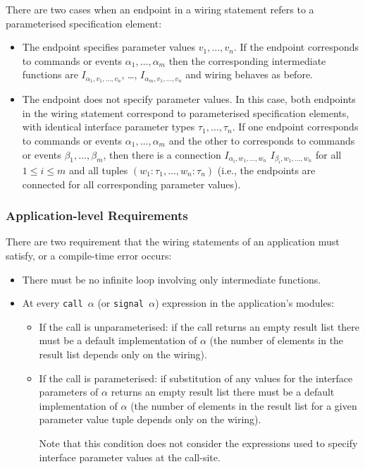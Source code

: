 \documentclass[11pt,letterpaper]{article}
\newcommand{\code}[1]{{\tt #1}}
\begin{document}
There are two cases when an endpoint in a wiring statement refers to a
parameterised specification element:
\begin{itemize}
\item The endpoint specifies parameter values $v_1, \ldots, v_n$. If the
endpoint corresponds to commands or events $\alpha_1, \ldots, \alpha_m$
then the corresponding intermediate functions are
$I_{\alpha_1,v_1,\ldots,v_n}$, \ldots, $I_{\alpha_m,v_1,\ldots,v_n}$ and
wiring behaves as before.
\item The endpoint does not specify parameter values. In this case, both
endpoints in the wiring statement correspond to parameterised specification
elements, with identical interface parameter types $\tau_1, \ldots,
\tau_n$. If one endpoint corresponds to commands or events $\alpha_1,
\ldots, \alpha_m$ and the other to corresponds to commands or events
$\beta_1, \ldots, \beta_m$, then there is a connection $I_{\alpha_i, w_1,
\ldots, w_n}$ \code{<->} $I_{\beta_i, w_1,\ldots, w_n}$ for all $1 \leq i
\leq m$ and all tuples $(w_1:\tau_1, \ldots, w_n:\tau_n)$ (i.e., the
endpoints are connected for all corresponding parameter values).
\end{itemize}

\subsubsection{Application-level Requirements}
\label{sec:wiring-reqs}

There are two requirement that the wiring statements of an application must
satisfy, or a compile-time error occurs:
\begin{itemize}
\item There must be no infinite loop involving only intermediate functions.
\item At every \code{call $\alpha$} (or \code{signal $\alpha$}) expression
in the application's modules:
\begin{itemize}
\item If the call is unparameterised: if the call returns an empty result
list there must be a default implementation of $\alpha$ (the number of
elements in the result list depends only on the wiring).
\item If the call is parameterised: if substitution of any values for the
interface parameters of $\alpha$ returns an empty result list there must be
a default implementation of $\alpha$ (the number of elements in the result
list for a given parameter value tuple depends only on the wiring).

Note that this condition does not consider the expressions used to specify
interface parameter values at the call-site.
\end{itemize}
\end{itemize}
\end{document}
